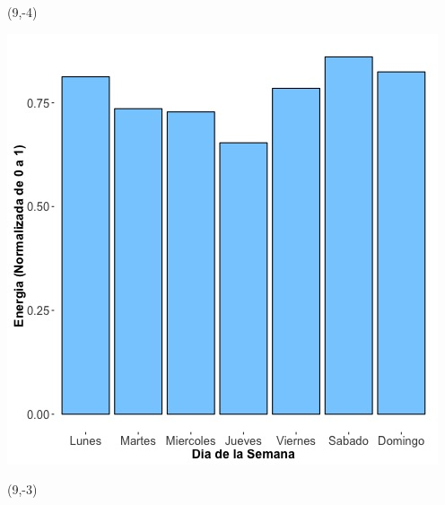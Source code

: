 \documentclass{article}\usepackage[]{graphicx}\usepackage[]{color}
\newenvironment{knitrout}{}{} %
\begin{document}
 \begin{textblock}{1}(9,-4)
\begin{minipage}{20em}
\begingroup

\endgroup
\end{minipage}
\end{textblock}


\begin{knitrout}
\color{fgcolor}
\includegraphics[scale=0.65]{figure/A25_day_of_week_plot} 
\end{knitrout}


 \begin{textblock}{1}(9,-3)
\begin{minipage}{20em}
\begingroup

\endgroup
\end{minipage}
\end{textblock}

 \vspace{2cm}
\end{document}
